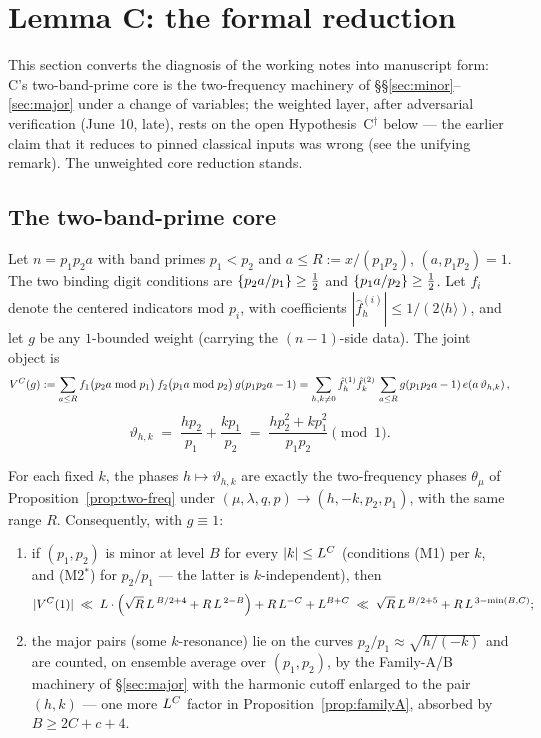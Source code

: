 \section{Lemma C: the formal reduction}\label{sec:lemmaC-red}

This section converts the diagnosis of the working notes into
manuscript form: C's two-band-prime core is the two-frequency machinery
of \S\S\ref{sec:minor}--\ref{sec:major} under a change of variables;
the weighted layer, after adversarial verification (June 10, late),
rests on the open Hypothesis~C$^\dagger$ below --- the earlier claim
that it reduces to pinned classical inputs was wrong (see the
unifying remark). The unweighted core reduction stands.

\subsection{The two-band-prime core}

Let $n=p_1p_2a$ with band primes $p_1<p_2$ and $a\le R:=x/(p_1p_2)$,
$(a,p_1p_2)=1$. The two binding digit conditions are
$\left\{p_2a/p_1\right\}\ge\tfrac12$ and $\left\{p_1a/p_2\right\}\ge\tfrac12$. Let
$f_i$ denote the centered indicators mod $p_i$, with coefficients
$|\hat f^{(i)}_h|\le1/(2\langle h\rangle)$, and let $g$ be any
$1$-bounded weight (carrying the $(n-1)$-side data). The joint object
is
\[
V^{C}(g):=\sum_{a\le R}f_1\big(p_2a\bmod p_1\big)\,
f_2\big(p_1a\bmod p_2\big)\,g(p_1p_2a-1)
=\sum_{h,k\ne0}\hat f^{(1)}_h\hat f^{(2)}_k\,
\sum_{a\le R}g(p_1p_2a-1)\,e\!\left(a\,\vartheta_{h,k}\right),
\]
\[
\vartheta_{h,k}\;=\;\frac{hp_2}{p_1}+\frac{kp_1}{p_2}
\;=\;\frac{hp_2^2+kp_1^2}{p_1p_2}\pmod 1 .
\]

\begin{proposition}\label{prop:C-cov}
\statusP\quad
For each fixed $k$, the phases $h\mapsto\vartheta_{h,k}$ are exactly
the two-frequency phases $\theta_\mu$ of
Proposition~\ref{prop:two-freq} under
$(\mu,\lambda,q,p)\to(h,-k,p_2,p_1)$, with the same range $R$.
Consequently, with $g\equiv1$:
\begin{enumerate}
\item if $(p_1,p_2)$ is minor at level $B$ for every
$|k|\le L^{C}$ (conditions (M1) per $k$, and (M2$^*$) for
$p_2/p_1$ --- the latter is $k$-independent), then
\[
|V^{C}(1)|\;\ll\;L\cdot\Big(\sqrt R\,L^{\,B/2+4}
+R\,L^{\,2-B}\Big)
+R\,L^{-C}+L^{B+C}
\;\ll\;\sqrt R\,L^{\,B/2+5}+R\,L^{\,3-\min(B,C)};
\]
\item the major pairs (some $k$-resonance) lie on the curves
$p_2/p_1\approx\sqrt{h/(-k)}$ and are counted, on ensemble average
over $(p_1,p_2)$, by the Family-A/B machinery of \S\ref{sec:major}
with the harmonic cutoff enlarged to the pair $(h,k)$ --- one more
$L^{C}$ factor in Proposition~\ref{prop:familyA}, absorbed by
$B\ge2C+c+4$.
\end{enumerate}
\end{proposition}

